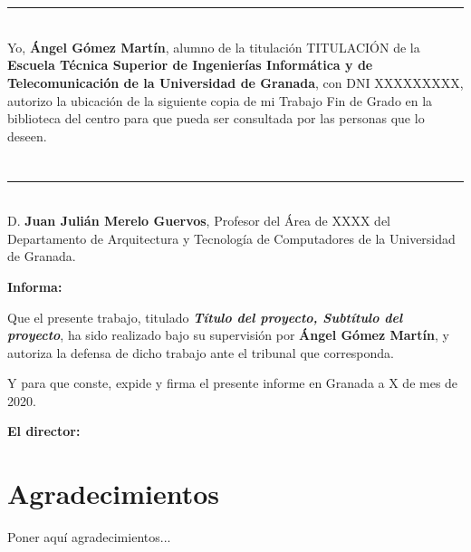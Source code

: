 \chapter*{}
\thispagestyle{empty}

\noindent\rule[-1ex]{\textwidth}{2pt}\\[4.5ex]

Yo, \textbf{Ángel Gómez Martín}, alumno de la titulación TITULACIÓN de la \textbf{Escuela Técnica Superior de Ingenierías Informática y de Telecomunicación de la Universidad de Granada}, con DNI XXXXXXXXX, autorizo la ubicación de la siguiente copia de mi Trabajo Fin de Grado en la biblioteca del centro para que pueda ser consultada por las personas que lo deseen.

\vspace{6cm}


\vspace{2cm}












\chapter*{}
\thispagestyle{empty}

\noindent\rule[-1ex]{\textwidth}{2pt}\\[4.5ex]

D. \textbf{Juan Julián Merelo Guervos}, Profesor del Área de XXXX del Departamento de Arquitectura y Tecnología de Computadores de la Universidad de Granada.

\vspace{0.5cm}

\textbf{Informa:}

\vspace{0.5cm}

Que el presente trabajo, titulado \textit{\textbf{Título del proyecto, Subtítulo del proyecto}},
ha sido realizado bajo su supervisión por \textbf{Ángel Gómez Martín}, y autoriza la defensa de dicho trabajo ante el tribunal que corresponda.

\vspace{0.5cm}

Y para que conste, expide y firma el presente informe en Granada a X de mes de 2020.

\vspace{1cm}

\textbf{El director:}

\vspace{5cm}









\chapter*{Agradecimientos}
\thispagestyle{empty}

       \vspace{1cm}


Poner aquí agradecimientos...

